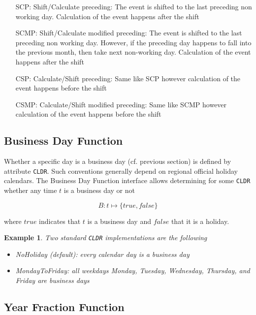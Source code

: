 \documentclass[9pt,oneside]{amsart}
\newtheorem{example}{Example}
\newcommand{\attr}[1]{\texttt{#1}}
\begin{document}
\begin{multicols}{2}
\begin{itemize}
	\item[SCP:] Shift/Calculate preceding: The event is shifted to the last preceding non working day. Calculation of the event happens after the shift

	\item[SCMP:] Shift/Calculate modified preceding: The event is shifted to the last preceding non working day. However, if the preceding day happens to fall into the previous month, then take next non-working day. Calculation of the event happens after the shift

	\item[CSP:] Calculate/Shift preceding: Same like SCP however calculation of the event happens before the shift

	\item[CSMP:] Calculate/Shift modified preceding: Same like SCMP however calculation of the event happens before the shift
\end{itemize}



\subsection{Business Day Function}

Whether a specific day is a business day (cf. previous section) is defined by attribute \attr{CLDR}. Such conventions generally depend on regional official holiday calendars. The Business Day Function interface allows determining for some \attr{CLDR} whether any time $t$ is a business day or not

\[
	B: t \mapsto \{true, false\}
\]

where $true$ indicates that $t$ is a business day and $false$ that it is a holiday.


\begin{example}
Two standard \attr{CLDR} implementations are the following
\begin{itemize}
	\item NoHoliday (default): every calendar day is a business day

	\item MondayToFriday: all weekdays Monday, Tuesday, Wednesday, Thursday, and Friday are business days
\end{itemize}
\end{example}


\subsection{Year Fraction Function}


\end{multicols}
\end{document}
